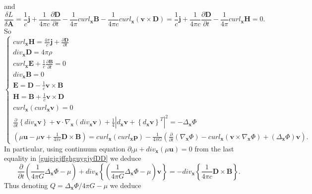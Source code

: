 \documentclass{article}
\theoremstyle{definition}
\theoremstyle{remark}
\renewcommand{\vec}[1]{\mathbf{#1}}
\newcommand{\er}{\eqref}
\newcommand{\er}{\eqref}
\begin{document}
and
\begin{equation}\label{vhfffngghkjgghggtghjgfhjhjkghghyuiuuDD}
\frac{\delta L}{\delta \vec A}=\frac{1}{c}\vec j+\frac{1}{4\pi
c}\frac{\partial\vec D}{\partial t}-\frac{1}{4\pi}curl_{\vec x}\vec
B-\frac{1}{4\pi c}curl_{\vec x}\left(\vec v\times \vec
D\right)=\frac{1}{c}\vec j+\frac{1}{4\pi c}\frac{\partial\vec
D}{\partial t}-\frac{1}{4\pi}curl_{\vec x}\vec H=0.
\end{equation}
So
\begin{equation}\label{guigjgjffghguygjyfDD}
\begin{cases}
curl_{\vec x}\vec H=\frac{4\pi}{c}\vec j+\frac{\partial\vec
D}{\partial
t}\\
div_{\vec x}\vec D=4\pi\rho\\
curl_{\vec x}\vec E+\frac{1}{c}\frac{\partial\vec B}{\partial t}=0\\
div_{\vec x}\vec B=0\\
\vec E=\vec D-\frac{1}{c}\vec v\times\vec B\\
\vec H=\vec B+\frac{1}{c}\vec v\times\vec D\\
curl_{\vec x}\left(curl_{\vec x}\vec v\right)=0
\\
\frac{\partial}{\partial t}\left\{div_{\vec x}\vec v\right\}+\vec
v\cdot\nabla_{\vec x}\left(div_{\vec x}\vec
v\right)+\frac{1}{4}\left|d_{\vec x}\vec v+\left\{d_{\vec x}\vec
v\right\}^T\right|^2=-\Delta_{\vec x}\Phi\\
\left(\mu\vec u-\mu\vec v+\frac{1}{4\pi c}\vec D\times\vec
B\right)=curl_{\vec x}\left(curl_{\vec x}\vec p\right)-\frac{1}{4\pi
G}\left(\frac{\partial}{\partial t}\left(\nabla_{\vec
x}\Phi\right)-curl_{\vec x}\left(\vec v\times\nabla_{\vec
x}\Phi\right)+\left(\Delta_{\vec x}\Phi\right)\vec v\right).
\end{cases}
\end{equation}
In particular, using continuum equation $\partial_t\mu+div_{\vec
x}\left(\mu\vec u\right)=0$ from the last equality in
\er{guigjgjffghguygjyfDD} we deduce
\begin{equation*}
\frac{\partial}{\partial t}\left(\frac{1}{4\pi G}\Delta_{\vec
x}\Phi-\mu\right)+div_{\vec x}\left\{\left(\frac{1}{4\pi
G}\Delta_{\vec x}\Phi-\mu\right)\vec v\right\}=-div_{\vec
x}\left\{\frac{1}{4\pi c}\vec D\times\vec B\right\}.
\end{equation*}
Thus denoting $Q=\Delta_{\vec x}\Phi/4\pi G-\mu$ we deduce
\end{document}
